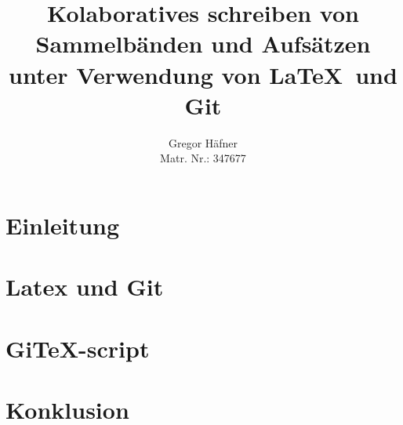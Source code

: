 \documentclass[12pt,a4paper]{scrartcl}
\author{Gregor Häfner \\
{\small Matr. Nr.: 347677} }
\title{Kolaboratives schreiben von Sammelbänden und Aufsätzen unter Verwendung von \LaTeX ~und Git}
\begin{document}
\maketitle
\tableofcontents

\section{Einleitung}



\section{Latex und Git}



\section{GiTeX-script}



\section{Konklusion}
\end{document}
